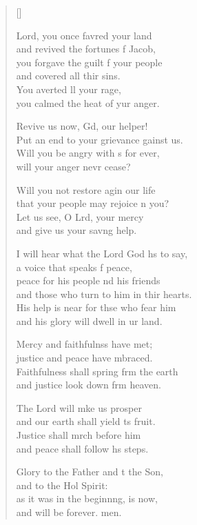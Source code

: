 \settowidth{\versewidth}{I will hear what the Lord God has to say, *}
\begin{verse}[\versewidth]
  \begin{patverse}
 Lord, you once favred your land\Med\\
and revived the fortunes f Jacob,\\
you forgave the guilt f your people\Med\\
and covered all thir sins.\\
You averted ll your rage,\Med\\
you calmed the heat of yur anger.

Revive us now, Gd, our helper!\Med\\
Put an end to your grievance gainst us.\\
Will you be angry with s for ever,\Med\\
will your anger nevr cease?

Will you not restore agin our life\Med\\
that your people may rejoice \pointup{\i}n you?\\
Let us see, O Lrd, your mercy\Med\\
and give us your sav\pointup{\i}ng help.

I will hear what the Lord God hs to say,\Med\\
a voice that speaks f peace,\\
peace for his people nd his friends\Med\\
and those who turn to him in thir hearts.\\
His help is near for thse who fear him\Med\\
and his glory will dwell in ur land.

Mercy and faithfulnss have met;\Med\\
justice and peace have mbraced.\\
Faithfulness shall spring frm the earth\Med\\
and justice look down frm heaven.

The Lord will mke us prosper\Med\\
and our earth shall yield \pointup{\i}ts fruit.\\
Justice shall mrch before him\Med\\
and peace shall follow h\pointup{\i}s steps.

Glory to the Father and t the Son,\Med\\
and to the Hol Spirit:\\
as it was in the beginn\pointup{\i}ng, is now,\Med\\
and will be forever. men.
  \end{patverse}
\end{verse}
